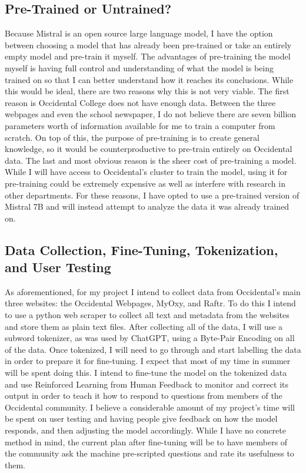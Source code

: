 \documentclass[10pt,twocolumn]{article}
\begin{document}
\subsection{Pre-Trained or Untrained?}

Because Mistral is an open source large language model, I have the option between choosing a model that has already been pre-trained or take an entirely empty model and pre-train it myself. The advantages of pre-training the model myself is having full control and understanding of what the model is being trained on so that I can better understand how it reaches its conclusions. While this would be ideal, there are two reasons why this is not very viable. The first reason is Occidental College does not have enough data. Between the three webpages and even the school newspaper, I do not believe there are seven billion parameters worth of information available for me to train a computer from scratch. On top of this, the purpose of pre-training is to create general knowledge, so it would be counterproductive to pre-train entirely on Occidental data. The last and most obvious reason is the sheer cost of pre-training a model. While I will have access to Occidental’s cluster to train the model, using it for pre-training could be extremely expensive as well as interfere with research in other departments. For these reasons, I have opted to use a pre-trained version of Mistral 7B and will instead attempt to analyze the data it was already trained on.

\subsection{Data Collection, Fine-Tuning, Tokenization, and User Testing}
As aforementioned, for my project I intend to collect data from Occidental’s main three websites: the Occidental Webpages, MyOxy, and Raftr. To do this I intend to use a python web scraper to collect all text and metadata from the websites and store them as plain text files. After collecting all of the data, I will use a subword tokenizer, as was used by ChatGPT, using a Byte-Pair Encoding on all of the data. Once tokenized, I will need to go through and start labelling the data in order to prepare it for fine-tuning. I expect that most of my time in summer will be spent doing this.  I intend to fine-tune the model on the tokenized data and use Reinforced Learning from Human Feedback to monitor and correct its output in order to teach it how to respond to questions from members of the Occidental community. I believe a considerable amount of my project's time will be spent on user testing and having people give feedback on how the model responds, and then adjusting the model accordingly. While I have no concrete method in mind, the current plan after fine-tuning will be to have members of the community ask the machine pre-scripted questions and rate its usefulness to them.
\end{document}

